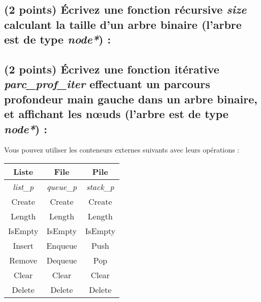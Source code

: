 \documentclass[11pt,a4paper]{article}
\begin{document}

\subsection{(2 points) \'Ecrivez une fonction récursive \og \textit{size} \fg{} calculant la taille d'un arbre binaire (l'arbre est de type \textit{node*}) : }

\begin{center}
\end{center}


\clearpage


\subsection{(2 points) \'Ecrivez une fonction itérative \og \textit{parc\_prof\_iter} \fg{} effectuant un parcours profondeur main gauche dans un arbre binaire, et affichant les nœuds (l'arbre est de type \textit{node*}) : }

\begin{center}

Vous pouvez utiliser les conteneurs externes suivants avec leurs opérations :

\medskip

\begin{tabular}{ |c|c|c| }
\hline
\textbf{Liste}    & \textbf{File}     & \textbf{Pile} \\ \hline
\textit{list\_p}  & \textit{queue\_p} & \textit{stack\_p} \\ \hline
Create  & Create  & Create  \\ \hline
Length  & Length  & Length  \\ \hline
IsEmpty & IsEmpty & IsEmpty \\ \hline
Insert  & Enqueue & Push    \\ \hline
Remove  & Dequeue & Pop     \\ \hline
Clear   & Clear   & Clear   \\ \hline
Delete  & Delete  & Delete  \\ \hline
\end{tabular}

\medskip

\end{center}
\end{document}
